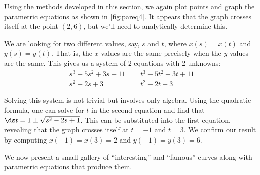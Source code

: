 {Using the methods developed in this section, we again plot points and graph the parametric equations as shown in \autoref{fig:pareq4}. It appears that the graph crosses itself at the point $(2,6)$, but we'll need to analytically determine this.

We are looking for two different values, say, $s$ and $t$, where $x(s) = x(t)$ and $y(s) = y(t)$. That is, the $x$-values are the same precisely when the $y$-values are the same. This gives us a system of 2 equations with 2 unknowns:
%
%
\begin{align*}
s^3-5s^2+3s+11 &= t^3-5t^2+3t+11 \\
s^2-2s+3 &= t^2-2t+3
\end{align*}

Solving this system is not trivial but involves only algebra. Using the qua\-dra\-tic formula, one can solve for $t$ in the second equation and find that $\ds t = 1\pm \sqrt{s^2-2s+1}$. This can be substituted into the first equation, revealing that the graph crosses itself at $t=-1$ and $t=3$. We confirm our result by computing $x(-1) = x(3)=2$ and $y(-1) = y(3) = 6$.}

We now present a small gallery of ``interesting'' and ``famous'' curves along with parametric equations that produce them.

